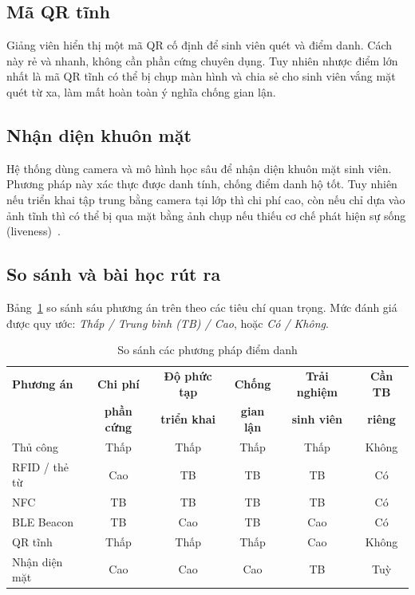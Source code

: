 \documentclass[../main.tex]{subfiles}
\begin{document}
\subsection{Mã QR tĩnh}
Giảng viên hiển thị một mã QR cố định để sinh viên quét và điểm danh. Cách này rẻ và
nhanh, không cần phần cứng chuyên dụng. Tuy nhiên nhược điểm lớn nhất là mã QR tĩnh có
thể bị chụp màn hình và chia sẻ cho sinh viên vắng mặt quét từ xa, làm mất hoàn toàn ý
nghĩa chống gian lận.

\subsection{Nhận diện khuôn mặt}
Hệ thống dùng camera và mô hình học sâu để nhận diện khuôn mặt sinh viên. Phương pháp này
xác thực được danh tính, chống điểm danh hộ tốt. Tuy nhiên nếu triển khai tập trung bằng
camera tại lớp thì chi phí cao, còn nếu chỉ dựa vào ảnh tĩnh thì có thể bị qua mặt bằng
ảnh chụp nếu thiếu cơ chế phát hiện sự sống (liveness)~\cite{schroff2015facenet}.

\subsection{So sánh và bài học rút ra}
\label{sec:so-sanh}

Bảng~\ref{tab:so-sanh} so sánh sáu phương án trên theo các tiêu chí quan trọng. Mức đánh
giá được quy ước: \textit{Thấp / Trung bình (TB) / Cao}, hoặc \textit{Có / Không}.

\begin{table}[H]
\centering
\small
\caption{So sánh các phương pháp điểm danh}
\label{tab:so-sanh}
\begin{tabular}{|p{2.6cm}|c|c|c|c|c|}
\hline
\textbf{Phương án} & \textbf{Chi phí} & \textbf{Độ phức tạp} & \textbf{Chống} & \textbf{Trải nghiệm} & \textbf{Cần TB} \\
 & \textbf{phần cứng} & \textbf{triển khai} & \textbf{gian lận} & \textbf{sinh viên} & \textbf{riêng} \\
\hline
Thủ công        & Thấp & Thấp & Thấp & Thấp & Không \\ \hline
RFID / thẻ từ   & Cao  & TB   & TB   & TB   & Có \\ \hline
NFC             & TB   & TB   & TB   & TB   & Có \\ \hline
BLE Beacon      & TB   & Cao  & TB   & Cao  & Có \\ \hline
QR tĩnh         & Thấp & Thấp & Thấp & Cao  & Không \\ \hline
Nhận diện mặt   & Cao  & Cao  & Cao  & TB   & Tuỳ \\ \hline
\end{tabular}
\end{table}
\end{document}
